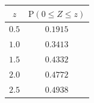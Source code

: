 {\setlength{\tabcolsep}{5pt}\renewcommand{\arraystretch}{1.25}%
\begin{tabular}{|c|c|}
\hline
$z$ & $\mathrm{P}(0\le Z\le z)$ \\
\hline
$0.5$ & $0.1915$ \\
\hline
$1.0$ & $0.3413$ \\
\hline
$1.5$ & $0.4332$ \\
\hline
$2.0$ & $0.4772$ \\
\hline
$2.5$ & $0.4938$ \\
\hline
\end{tabular}}
